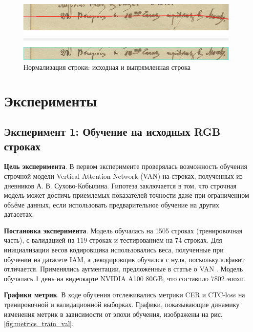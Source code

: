 \documentclass{extarticle}
\begin{document}
\begin{figure}[H]
	\centering
	\includegraphics[width=0.99\textwidth]{images/нарезка_на_строки_3.png}
	\caption{Нормализация строки: исходная и выпрямленная строка}
	\label{fig:line_normalization}
\end{figure}


\section{Эксперименты}

\subsection{Эксперимент 1: Обучение на исходных RGB строках}

\textbf{Цель эксперимента}. В первом эксперименте проверялась возможность обучения строчной модели Vertical Attention Network (VAN) на строках, полученных из дневников А. В. Сухово-Кобылина. Гипотеза заключается в том, что строчная модель может достичь приемлемых показателей точности даже при ограниченном объёме данных, если использовать предварительное обучение на других датасетах.

\textbf{Постановка эксперимента}. Модель обучалась на 1505 строках (тренировочная часть), с валидацией на 119 строках и тестированием на 74 строках. Для инициализации весов кодировщика использовались веса, полученные при обучении на датасете IAM, а декодировщик обучался с нуля, поскольку алфавит отличается. Применялись аугментации, предложенные в статье о VAN \cite{VAN}. Модель обучалась 1 день на видеокарте NVIDIA A100 80GB, что составило 7802 эпохи.

\textbf{Графики метрик}. В ходе обучения отслеживались метрики CER и CTC-loss на тренировочной и валидационной выборках. Графики, показывающие динамику изменения метрик в зависимости от эпохи обучения, изображены на рис. \ref{fig:metrics_train_val}.
\end{document}
